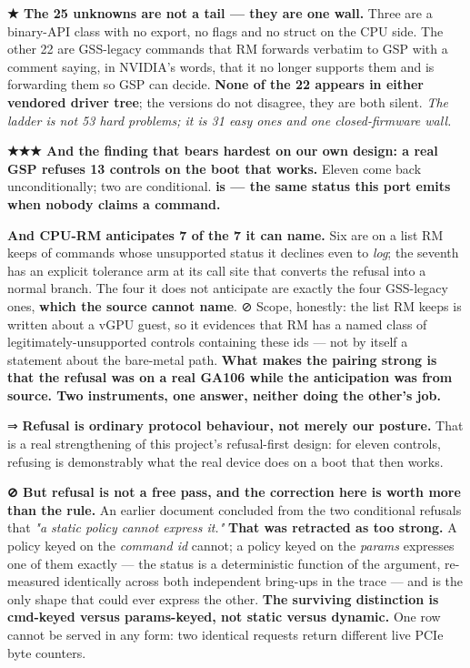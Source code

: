 \documentclass[10.5pt]{article}
\begin{document}
\textbf{★ The 25 unknowns are not a tail — they are one wall.} Three are a binary-API class with
no export, no flags and no struct on the CPU side. The other 22 are GSS-legacy commands that RM
forwards verbatim to GSP with a comment saying, in NVIDIA's words, that it no longer supports
them and is forwarding them so GSP can decide. \textbf{None of the 22 appears in either vendored
driver tree}; the versions do not disagree, they are both silent. \emph{The ladder is not 53 hard
problems; it is 31 easy ones and one closed-firmware wall.}

\begin{claimbox}\small
\textbf{★★★ And the finding that bears hardest on our own design: a real GSP refuses 13 controls
on the boot that works.} Eleven come back  unconditionally; two are
conditional. \textbf{ is  — the same status this port
emits when nobody claims a command.}

\smallskip
\textbf{And CPU-RM anticipates 7 of the 7 it can name.} Six are on a list RM keeps of commands
whose unsupported status it declines even to \emph{log}; the seventh has an explicit tolerance
arm at its call site that converts the refusal into a normal branch. The four it does not
anticipate are exactly the four GSS-legacy ones, \textbf{which the source cannot name}. ⊘ Scope,
honestly: the list RM keeps is written about a vGPU guest, so it evidences that RM has a named
class of legitimately-unsupported controls containing these ids — not by itself a statement about
the bare-metal path. \textbf{What makes the pairing strong is that the refusal was \measured{} on
a real GA106 while the anticipation was \inferred{} from source. Two instruments, one answer,
neither doing the other's job.}

\smallskip
⇒ \textbf{Refusal is ordinary protocol behaviour, not merely our posture.} That is a real
strengthening of this project's refusal-first design: for eleven controls, refusing is
demonstrably what the real device does on a boot that then works.
\end{claimbox}

\textbf{⊘ But refusal is not a free pass, and the correction here is worth more than the rule.}
An earlier document concluded from the two conditional refusals that \emph{"a static policy
cannot express it."} \textbf{That was retracted as too strong.} A policy keyed on the
\emph{command id} cannot; a policy keyed on the \emph{params} expresses one of them exactly — the
status is a deterministic function of the argument, re-measured identically across both
independent bring-ups in the trace — and is the only shape that could ever express the other.
\textbf{The surviving distinction is cmd-keyed versus params-keyed, not static versus dynamic.}
One row cannot be served in any form: two identical requests return different live PCIe byte
counters.
\end{document}
